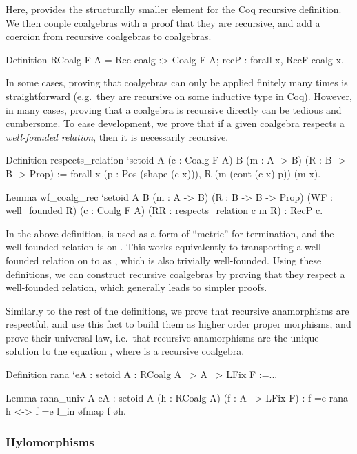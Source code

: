 \documentclass[anonymous, a4paper, UKenglish, cleveref, autoref, thm-restate]{lipics-v2021}
\begin{document}
Here,  provides the structurally smaller element for
the Coq recursive definition. We then couple coalgebras with a proof that they
are recursive, and add a coercion from recursive coalgebras to coalgebras.
\begin{coqcode}
Definition RCoalg F A = Rec {coalg :> Coalg F A; recP : forall x, RecF coalg x}.
\end{coqcode}
In some cases, proving that coalgebras can only be applied finitely many
times is straightforward (e.g.\ they are recursive on some inductive type in
Coq). However, in many cases, proving that a coalgebra is recursive directly
can be tedious and cumbersome. To ease development, we prove that if a
given coalgebra respects a \emph{well-founded relation}, then it is
necessarily recursive.
\begin{coqcode}
Definition respects_relation `{setoid A} (c : Coalg F A)
      {B} (m : A -> B) (R : B -> B -> Prop)
  := forall x (p : Pos (shape (c x))), R (m (cont (c x) p)) (m x).

Lemma wf_coalg_rec `{setoid A} {B}
  (m : A -> B) (R : B -> B -> Prop) (WF : well_founded R)
  (c : Coalg F A) (RR : respects_relation c m R) : RecP c.
\end{coqcode}
In the above definition,  is used as a form of ``metric''
for termination, and the well-founded relation is on . This
works equivalently to transporting a well-founded relation
on
 to  as
, which is also trivially
well-founded. Using these definitions, we can construct recursive coalgebras by
proving that they respect a well-founded relation, which generally leads to
simpler proofs.

Similarly to the rest of the definitions, we prove that recursive anamorphisms
are respectful, and use this fact to build them as higher order proper
morphisms, and prove their universal law, i.e.\ that recursive anamorphisms are
the unique solution to the equation
,
where  is a recursive coalgebra.
\begin{coqcode}
Definition rana `{eA : setoid A} : RCoalg A ~> A ~> LFix F :=...

Lemma rana_univ A {eA : setoid A} (h : RCoalg A) (f : A ~> LFix F)
    : f =e rana h <-> f =e l_in \o fmap f \o h.
\end{coqcode}

\subsubsection{Hylomorphisms}
\end{document}
